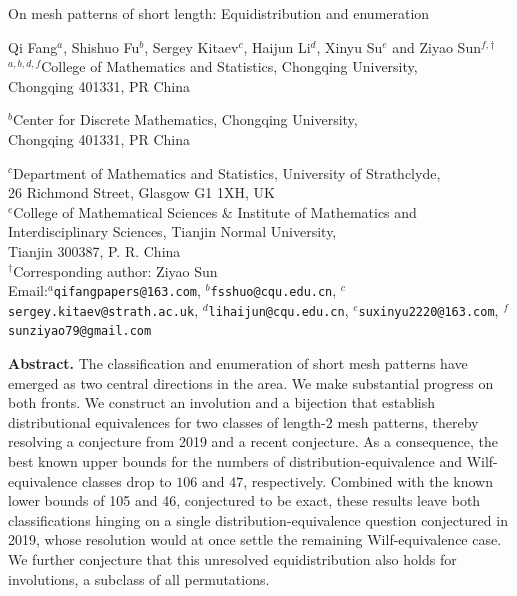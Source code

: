 \documentclass[12pt]{article}
\begin{document}
\begin{center}
{\large On mesh patterns of short length: Equidistribution and enumeration}
\end{center}

\begin{center}
{\small
Qi Fang$^{a}$, Shishuo Fu$^{b}$, Sergey Kitaev$^{c}$, Haijun Li$^{d}$, Xinyu Su$^{e}$ and Ziyao Sun$^{f,\dagger}$
\\[6pt]

$^{a, b, d, f}$College of Mathematics and Statistics, Chongqing University,\\ Chongqing 401331, PR China

$^{b}$Center for Discrete Mathematics, Chongqing University,\\ Chongqing 401331, PR China

$^{c}$Department of Mathematics and Statistics, University of Strathclyde, \\ 26 Richmond Street, Glasgow G1 1XH, UK\\[6pt]

$^{e}$College of Mathematical Sciences \& Institute of Mathematics and Interdisciplinary Sciences, Tianjin Normal University, \\ Tianjin  300387, P. R. China\\[6pt]

$^\dagger$Corresponding author: Ziyao Sun\\[6pt]


Email:$^{a}${\tt  qifangpapers@163.com},
           $^{b}${\tt  fsshuo@cqu.edu.cn},
           $^{c}${\tt sergey.kitaev@strath.ac.uk},
           $^{d}${\tt  lihaijun@cqu.edu.cn},
           $^{e}${\tt suxinyu2220@163.com},
           $^{f}${\tt  sunziyao79@gmail.com}
           }
\end{center}

\noindent\textbf{Abstract.} The classification and enumeration of short mesh patterns have emerged as two central directions in the area. We make substantial progress on both fronts. We construct an involution and a bijection that establish distributional equivalences for two classes of length-$2$ mesh patterns, thereby resolving a conjecture from 2019 and a recent conjecture. As a consequence, the best known upper bounds for the numbers of distribution-equivalence and Wilf-equivalence classes drop to $106$ and $47$, respectively. Combined with the known lower bounds of 105 and 46, conjectured to be exact, these results leave both classifications hinging on a single distribution-equivalence question conjectured in 2019, whose resolution would at once settle the remaining Wilf-equivalence case. We further conjecture that this unresolved equidistribution also holds for involutions, a subclass of all permutations.
\end{document}
